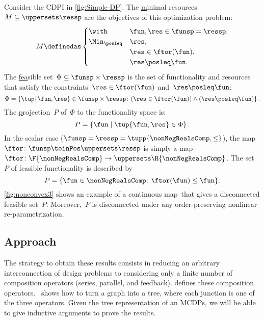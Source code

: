 \begin{example}
    \label{exa:one}
    Consider the CDPI in \cref{fig:Simple-DP}.
    The \uline{m}inimal resources~$M\subseteq\uppersets \ressp$ are the objectives of this optimization problem:
    \begin{equation*}
        M\definedas\begin{cases}
                       \with & \fun,\res\in\funsp=\ressp,\\
                       \Min_{\posleq} & \res,\\
                       & \res\in\ftor(\fun),\\
                       & \res\posleq\fun.
        \end{cases}
    \end{equation*}
    The \uline{fea}sible set~$\Phi\subseteq\funsp\times\ressp$ is the set of functionality and resources that satisfy the constraints~$\res\in\ftor(\fun)$ and~$\res\posleq\fun$:
    \begin{equation}
        \Phi=\left\{ \tup{\fun,\res}\in\funsp\times\ressp\colon (\res\in\ftor(\fun))\wedge(\res\posleq\fun)\right\} .\label{eq:feasible}
    \end{equation}
    The \uline{p}rojection~$P$ of~$\Phi$ to the functionality space is:
    \begin{equation*}
        P=\left\{ \fun\mid\tup{\fun,\res} \in\Phi\right\}.
    \end{equation*}
    In the scalar case ($\funsp=\ressp=\tupp{\nonNegRealsComp,\leq}$), the map~$\ftor\colon\funsp\toinPos\uppersets \ressp$ is simply a map~$\ftor\colon\F{\nonNegRealsComp}\to \uppersets\R{\nonNegRealsComp}$.
    The set~$P$ of feasible functionality is described by
    \begin{equation}
        P=\{\fun\in\nonNegRealsComp\colon \ftor(\fun)\leq\fun\}.\label{eq:Pfeasible}
    \end{equation}
    \cref{fig:nonconvex3} shows an example of a continuous map~\ftor that gives a disconnected feasible set~$P$. Moreover,~$P$ is disconnected under any order-preserving nonlinear re-parametrization.

\end{example}

\subsection{Approach}

The strategy to obtain these results  consists in reducing an arbitrary interconnection of design problems to considering only a finite number of composition operators (series, parallel, and feedback).
 defines these composition operators.
~shows how to turn a graph into a tree, where each junction is one of the three operators. Given the tree representation of an MCDPs, we will be able to give inductive arguments to prove the results.

